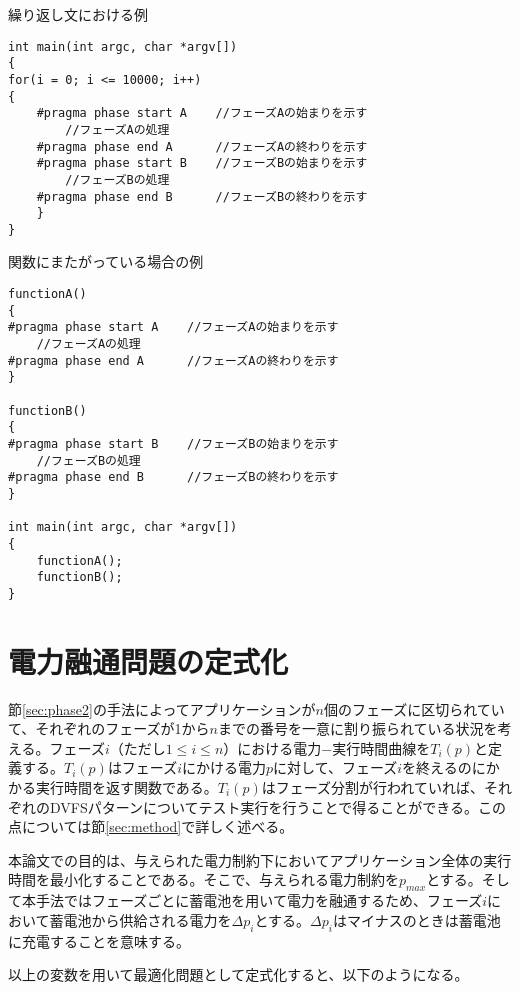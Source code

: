 {\small
\begin{itembox}[c]{繰り返し文における例}
\begin{verbatim}
int main(int argc, char *argv[])
{
for(i = 0; i <= 10000; i++)
{
    #pragma phase start A    //フェーズAの始まりを示す
        //フェーズAの処理
    #pragma phase end A      //フェーズAの終わりを示す
    #pragma phase start B    //フェーズBの始まりを示す
        //フェーズBの処理
    #pragma phase end B      //フェーズBの終わりを示す
    }
}
\end{verbatim}
\end{itembox}}

{\small
\begin{itembox}[c]{関数にまたがっている場合の例}
\begin{verbatim}
functionA()
{
#pragma phase start A    //フェーズAの始まりを示す
    //フェーズAの処理
#pragma phase end A      //フェーズAの終わりを示す
}

functionB()
{
#pragma phase start B    //フェーズBの始まりを示す
    //フェーズBの処理
#pragma phase end B      //フェーズBの終わりを示す
}

int main(int argc, char *argv[])
{
    functionA();
    functionB();
}
\end{verbatim}
\end{itembox}}


\section{電力融通問題の定式化}
\label{sec:formularization}

節\ref{sec:phase2}の手法によってアプリケーションが$n$個のフェーズに区切られていて、それぞれのフェーズが1から$n$までの番号を一意に割り振られている状況を考える。フェーズ$i$（ただし$1\leq i\leq n$）における電力−実行時間曲線を$T_i(p)$と定義する。$T_i(p)$はフェーズ$i$にかける電力$p$に対して、フェーズ$i$を終えるのにかかる実行時間を返す関数である。$T_i(p)$はフェーズ分割が行われていれば、それぞれのDVFSパターンについてテスト実行を行うことで得ることができる。この点については節\ref{sec:method}で詳しく述べる。

本論文での目的は、与えられた電力制約下においてアプリケーション全体の実行時間を最小化することである。そこで、与えられる電力制約を$p_{max}$とする。そして本手法ではフェーズごとに蓄電池を用いて電力を融通するため、フェーズ$i$において蓄電池から供給される電力を$\Delta p_i$とする。$\Delta p_i$はマイナスのときは蓄電池に充電することを意味する。

以上の変数を用いて最適化問題として定式化すると、以下のようになる。

